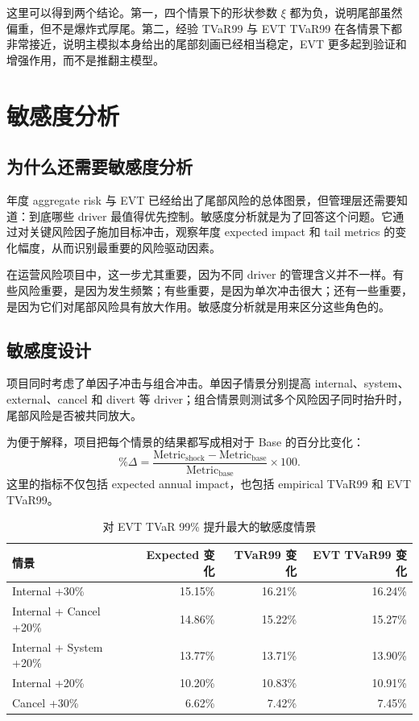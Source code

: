 \documentclass[UTF8,fontset=fandol,11pt]{ctexart}
\begin{document}
这里可以得到两个结论。第一，四个情景下的形状参数 \(\xi\) 都为负，说明尾部虽然偏重，但不是爆炸式厚尾。第二，经验 TVaR99 与 EVT TVaR99 在各情景下都非常接近，说明主模拟本身给出的尾部刻画已经相当稳定，EVT 更多起到验证和增强作用，而不是推翻主模型。

\section{敏感度分析}

\subsection{为什么还需要敏感度分析}
年度 aggregate risk 与 EVT 已经给出了尾部风险的总体图景，但管理层还需要知道：到底哪些 driver 最值得优先控制。敏感度分析就是为了回答这个问题。它通过对关键风险因子施加目标冲击，观察年度 expected impact 和 tail metrics 的变化幅度，从而识别最重要的风险驱动因素。

在运营风险项目中，这一步尤其重要，因为不同 driver 的管理含义并不一样。有些风险重要，是因为发生频繁；有些重要，是因为单次冲击很大；还有一些重要，是因为它们对尾部风险具有放大作用。敏感度分析就是用来区分这些角色的。

\subsection{敏感度设计}
项目同时考虑了单因子冲击与组合冲击。单因子情景分别提高 internal、system、external、cancel 和 divert 等 driver；组合情景则测试多个风险因子同时抬升时，尾部风险是否被共同放大。

为便于解释，项目把每个情景的结果都写成相对于 Base 的百分比变化：
\[
\%\Delta = \frac{\text{Metric}_{\text{shock}}-\text{Metric}_{\text{base}}}{\text{Metric}_{\text{base}}}\times 100.
\]
这里的指标不仅包括 expected annual impact，也包括 empirical TVaR99 和 EVT TVaR99。

\begin{table}[H]
\centering
\caption{对 EVT TVaR 99\% 提升最大的敏感度情景}
\begin{tabular}{lrrr}
\toprule
情景 & Expected 变化 & TVaR99 变化 & EVT TVaR99 变化 \\
\midrule
Internal +30\% & 15.15\% & 16.21\% & 16.24\% \\
Internal + Cancel +20\% & 14.86\% & 15.22\% & 15.27\% \\
Internal + System +20\% & 13.77\% & 13.71\% & 13.90\% \\
Internal +20\% & 10.20\% & 10.83\% & 10.91\% \\
Cancel +30\% & 6.62\% & 7.42\% & 7.45\% \\
\bottomrule
\end{tabular}
\end{table}
\end{document}
